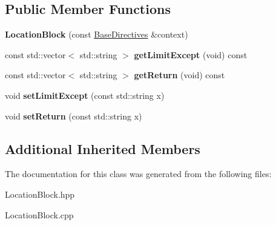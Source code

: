 \subsection*{Public Member Functions}
\begin{DoxyCompactItemize}
\item 
\mbox{\label{classft_1_1LocationBlock_a33a54f6a797cae57f127377537854c7f}} 
{\bfseries Location\+Block} (const \hyperlink{classft_1_1BaseDirectives}{Base\+Directives} \&context)
\item 
\mbox{\label{classft_1_1LocationBlock_a0bf5965b1397565091cfff9945387697}} 
const std\+::vector$<$ std\+::string $>$ {\bfseries get\+Limit\+Except} (void) const
\item 
\mbox{\label{classft_1_1LocationBlock_a350949488785434fd8616c463b3a0491}} 
const std\+::vector$<$ std\+::string $>$ {\bfseries get\+Return} (void) const
\item 
\mbox{\label{classft_1_1LocationBlock_a45990417ebcd86dd03d64d464a51ed82}} 
void {\bfseries set\+Limit\+Except} (const std\+::string x)
\item 
\mbox{\label{classft_1_1LocationBlock_ae6e60dcfae2423c1fe03403d57a383b4}} 
void {\bfseries set\+Return} (const std\+::string x)
\end{DoxyCompactItemize}
\subsection*{Additional Inherited Members}


The documentation for this class was generated from the following files\+:\begin{DoxyCompactItemize}
\item 
Location\+Block.\+hpp\item 
Location\+Block.\+cpp\end{DoxyCompactItemize}
